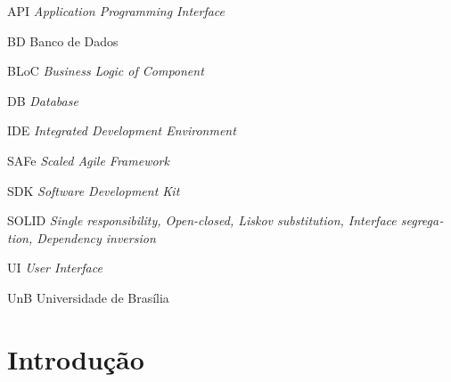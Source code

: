 \documentclass[
	12pt,				%
	oneside,			%
	a4paper,			%
	english,			%
	brazil,				%
	]{abntex2}
\begin{document}
\begin{siglas}
  \item[API] \foreignlanguage{english}{\textit{Application Programming Interface}}
  \item[BD] Banco de Dados
  \item[BLoC] \foreignlanguage{english}{\textit{Business Logic of Component}}
  \item[DB] \foreignlanguage{english}{\textit{Database}}
  \item[IDE] \foreignlanguage{english}{\textit{Integrated Development Environment}}
  \item[SAFe] \foreignlanguage{english}{\textit{Scaled Agile Framework}}
  \item[SDK] \foreignlanguage{english}{\textit{Software Development Kit}}
  \item[SOLID] \foreignlanguage{english}{\textit{Single responsibility, Open-closed, Liskov substitution, Interface segregation, Dependency inversion}}
  \item[UI] \foreignlanguage{english}{\textit{User Interface}}
  \item[UnB] Universidade de Brasília
\end{siglas}


\tableofcontents*
\cleardoublepage


\textual

\chapter{Introdução}
\end{document}
